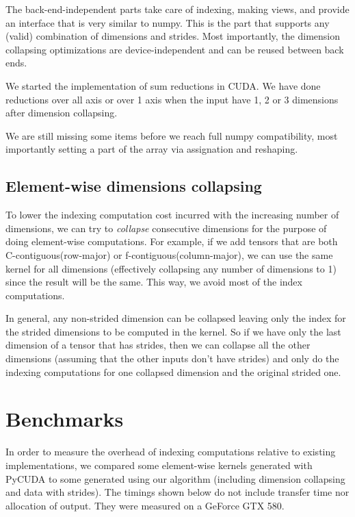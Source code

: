 \documentclass{article} %
\begin{document}
The back-end-independent parts take care of indexing, making views, and provide an interface that is very similar to numpy.
This is the part that supports any (valid) combination of dimensions and strides.
Most importantly, the dimension collapsing optimizations are device-independent and can be reused between back ends.

We started the implementation of sum reductions in CUDA.
We have done reductions over all axis or over 1 axis when the input have 1, 2 or 3 dimensions after dimension collapsing.

We are still missing some items before we reach full numpy compatibility, most importantly setting a part of the array via assignation and reshaping.

\subsection{Element-wise dimensions collapsing}

To lower the indexing computation cost incurred with the increasing number of dimensions, we can try to \emph{collapse} consecutive dimensions for the purpose of doing element-wise computations.
For example, if we add tensors that are both C-contiguous(row-major) or f-contiguous(column-major), we can use the same kernel for all dimensions (effectively collapsing any number of dimensions to 1) since the result will be the same.
This way,  we avoid most of the index computations.

In general, any non-strided dimension can be collapsed leaving only the index for the strided dimensions to be computed in the kernel.
So if we have only the last dimension of a tensor that has strides, then we can collapse all the other dimensions (assuming that the other inputs don't have strides) and only do the indexing computations for one collapsed dimension and the original strided one.

\section{Benchmarks}

In order to measure the overhead of indexing computations relative to existing implementations, we compared some element-wise kernels generated with PyCUDA to some generated using our algorithm (including dimension collapsing and data with strides).
The timings shown below do not include transfer time nor allocation of output.
They were measured on a GeForce GTX 580.
\end{document}
